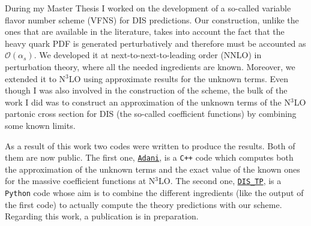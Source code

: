 \documentclass[11pt,a4paper]{moderncv}        %
\begin{document}
During my Master Thesis I worked on the development of a so-called variable flavor number scheme (VFNS) 
for DIS predictions.
%
%
Our construction, unlike the ones that are available in the literature, takes into account the fact that the heavy quark PDF is generated
perturbatively and therefore must be accounted as $\mathcal{O}(\alpha_s)$.
%
We developed it at next-to-next-to-leading order (NNLO) in perturbation theory, where all the needed ingredients are known.
Moreover, we extended it to N$^3$LO using approximate results for the unknown terms.
Even though I was also involved in the construction of the scheme, the bulk of the work I did was to
construct an approximation of the unknown terms of the N$^3$LO partonic cross section for DIS (the so-called coefficient functions) by
combining some known limits.


As a result of this work two codes were written to produce the results.
Both of them are now public.
The first one, \href{https://github.com/niclaurenti/adani}{\texttt{Adani}}, is a \texttt{C++} code 
which computes both the approximation of the unknown terms and the exact value of the known ones
for the massive coefficient functions at N$^3$LO.
%
The second one, \href{https://github.com/andreab1997/DIS_TP}{\texttt{DIS\_TP}}, is a \texttt{Python} code whose aim is to combine the different ingredients 
(like the output of the first code) to actually
compute the theory predictions with our scheme.
%
Regarding this work, a publication is in preparation.
\end{document}
